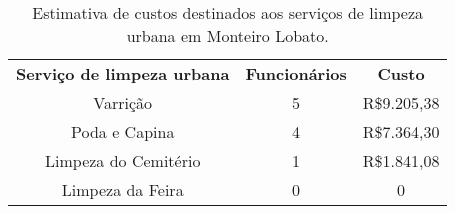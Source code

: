 \begin{table}\label{tab:custo_limpeza}
	\begin{center}
		\caption{Estimativa de custos destinados aos serviços de limpeza urbana em Monteiro Lobato.}
\begin{tabular}{ccc}
\rowcolor[rgb]{ .969,  .588,  .275} \textbf{Serviço de limpeza urbana} & \textbf{Funcionários} & \textbf{Custo} \\
\rowcolor[rgb]{ .992,  .914,  .851} Varrição & 5     & R\$9.205,38 \\
\rowcolor[rgb]{ .976,  .737,  .541} Poda e Capina & 4     & R\$7.364,30 \\
\rowcolor[rgb]{ .992,  .914,  .851} Limpeza do Cemitério & 1     & R\$1.841,08 \\
\rowcolor[rgb]{ .976,  .737,  .541} Limpeza da Feira & \cellcolor[rgb]{ .98,  .749,  .561}0 & \cellcolor[rgb]{ .98,  .749,  .561}0 \\
\end{tabular}%
\end{center}

\end{table}
